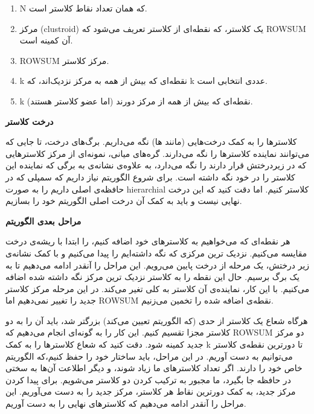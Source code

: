 \documentclass[a4paper,12pt]{article}
\begin{document}
\begin{enumerate}
	\item 
	N
	که همان تعداد نقاط کلاستر است. 

	\item 
	مرکز 
	(clustroid)
	یک کلاستر، که نقطه‌ای از کلاستر تعریف می‌شود که 
	ROWSUM 
	آن کمینه است. 

	\item 
	ROWSUM
	مرکز کلاستر. 

	\item 
	k
	نقطه‌ای که بیش از همه به مرکز نزدیک‌اند، که 
	k
	عددی انتخابی است. 

	\item 
	k
	نقطه‌ای که بیش از همه از مرکز دورند (اما عضو کلاستر هستند).
\end{enumerate}

\textbf{درخت کلاستر}

کلاستر‌ها را به کمک درخت‌هایی (مانند
ها) 
نگه می‌داریم. برگ‌های درخت، تا جایی که می‌توانند نماینده‌ کلاستر‌ها را نگه 
می‌دارند. گره‌های میانی، نمونه‌ای از مرکز کلاستر‌هایی که در زیردرختش 
قرار دارند را نگه می‌دارد، به علاوه‌ی نشانه‌ی به برگی که نماینده این کلاستر را در خود نگه داشته است.
برای شروع الگوریتم نیاز داریم که سمپلی که در 
حافظه‌ی اصلی داریم را به صورت
hierarchial
کلاستر کنیم. اما دقت کنید که این درخت نهایی نیست و باید به کمک آن 
درخت اصلی الگوریتم خود را بسازیم. 




\textbf{مراحل بعدی الگوریتم}

هر نقطه‌ای که می‌خواهیم به کلاسترهای خود اضافه کنیم، را ابتدا با ریشه‌ی درخت 
مقایسه می‌کنیم. نزدیک ترین مرکزی که نگه داشته‌ایم را پیدا می‌کنیم و 
با کمک نشانه‌ی زیر درختش، یک مرحله از درخت پایین می‌رویم. این مراحل را آنقدر 
ادامه می‌دهیم تا به یک برگ برسیم. حال این نقطه را به کلاستر نزدیک ترین مرکز 
نگه داشته شده اضافه می‌کنیم. با این کار، نماینده‌ی آن کلاستر به کلی تغیر می‌کند. در این مرحله مرکز کلاستر 
جدید را تغییر نمی‌دهیم اما 
ROWSUM
نقطه‌ی اضافه شده را تخمین می‌زنیم. 


هرگاه شعاع یک کلاستر از حدی (که الگوریتم تعیین می‌کند) بزرگتر شد، باید آن را 
به دو کلاستر مجزا تقسیم کنیم. این کار را به گونه‌ای انجام می‌دهیم که 
ROWSUM
دو مرکز جدید کمینه شود. دقت کنید که شعاع کلاستر‌ها را به کمک
k
تا دورترین نقطه‌ی کلاستر می‌توانیم به دست آوریم. در این مراحل، باید ساختار 
خود را حفظ کنیم،‌که الگوریتم‌ خاص خود را دارند. 
اگر تعداد کلاستر‌های ما زیاد شوند، و دیگر اطلاعت آن‌ها به سختی در حافظه جا بگیرد، ما مجبور به 
ترکیب کردن دو کلاستر می‌شویم. برای پیدا کردن مرکز جدید، به کمک دورترین نقاط هر کلاستر، مرکز جدید 
را به دست می‌آوریم. این مراحل را آنقدر ادامه می‌دهیم که کلاستر‌های نهایی را به دست آوریم. 
\end{document}
